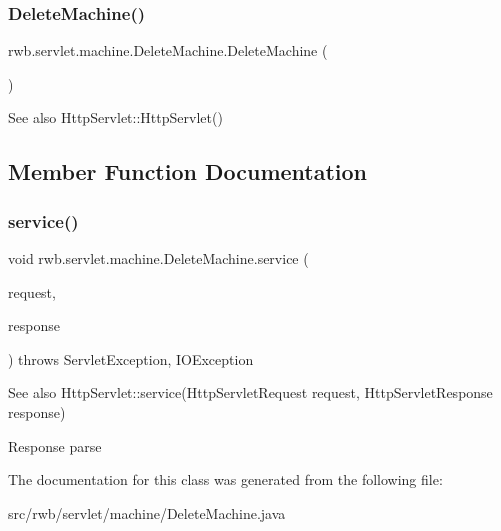 \subsubsection{\texorpdfstring{Delete\+Machine()}{DeleteMachine()}}
{\footnotesize\ttfamily rwb.\+servlet.\+machine.\+Delete\+Machine.\+Delete\+Machine (\begin{DoxyParamCaption}{ }\end{DoxyParamCaption})}

\begin{DoxySeeAlso}{See also}
Http\+Servlet\+::\+Http\+Servlet() 
\end{DoxySeeAlso}


\subsection{Member Function Documentation}
\mbox{\label{classrwb_1_1servlet_1_1machine_1_1_delete_machine_aea329f627d912380bb5f8bb0224e94bf}} 
\subsubsection{\texorpdfstring{service()}{service()}}
{\footnotesize\ttfamily void rwb.\+servlet.\+machine.\+Delete\+Machine.\+service (\begin{DoxyParamCaption}\item[{Http\+Servlet\+Request}]{request,  }\item[{Http\+Servlet\+Response}]{response }\end{DoxyParamCaption}) throws Servlet\+Exception, I\+O\+Exception\hspace{0.3cm}{\ttfamily [protected]}}

\begin{DoxySeeAlso}{See also}
Http\+Servlet\+::service(\+Http\+Servlet\+Request request, Http\+Servlet\+Response response) 
\end{DoxySeeAlso}
Response parse

The documentation for this class was generated from the following file\+:\begin{DoxyCompactItemize}
\item 
src/rwb/servlet/machine/Delete\+Machine.\+java\end{DoxyCompactItemize}
